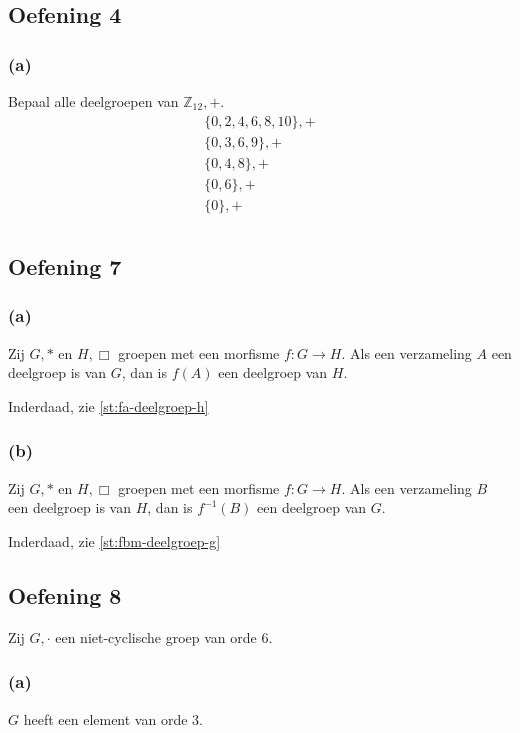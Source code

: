 \documentclass[main.tex]{subfiles}
\begin{document}


\subsection*{Oefening 4}

\subsubsection{(a)}
Bepaal alle deelgroepen van $\mathbb{Z}_{12},+$.
\[
\begin{array}{c}
  \{ 0,2,4,6,8,10 \},+\\
  \{ 0,3,6,9 \},+\\
  \{ 0,4,8 \},+\\
  \{ 0,6 \},+\\
  \{ 0 \},+\\
\end{array}
\]





\subsection*{Oefening 7}
\subsubsection*{(a)}
Zij $G,*$ en $H,\Box$ groepen met een morfisme $f: G \rightarrow H$.
Als een verzameling $A$ een deelgroep is van $G$, dan is $f(A)$ een deelgroep van $H$.

Inderdaad, zie \ref{st:fa-deelgroep-h}
\subsubsection*{(b)}
Zij $G,*$ en $H,\Box$ groepen met een morfisme $f: G \rightarrow H$.
Als een verzameling $B$ een deelgroep is van $H$, dan is $f^{-1}(B)$ een deelgroep van $G$.

Inderdaad, zie \ref{st:fbm-deelgroep-g}

\subsection*{Oefening 8}
Zij $G,\cdot$ een niet-cyclische groep van orde $6$.

\subsubsection*{(a)}
$G$ heeft een element van orde $3$.
\end{document}
